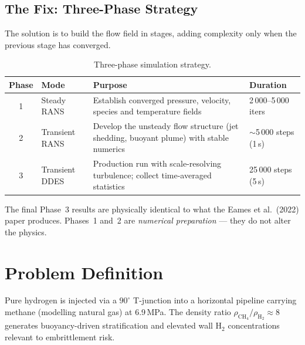 \documentclass[12pt,a4paper]{report}
\begin{document}
\subsection{The Fix: Three-Phase Strategy}

The solution is to build the flow field in stages, adding complexity
only when the previous stage has converged.

\begin{table}[H]
\centering
\caption{Three-phase simulation strategy.}
\label{tab:phases}
\begin{tabularx}{\textwidth}{@{}clXl@{}}
\toprule
\textbf{Phase} & \textbf{Mode} & \textbf{Purpose} & \textbf{Duration} \\
\midrule
1 & Steady RANS   & Establish converged pressure, velocity, species
                    and temperature fields & 2\,000--5\,000 iters \\
2 & Transient RANS & Develop the unsteady flow structure (jet
                     shedding, buoyant plume) with stable numerics
                   & $\sim$5\,000 steps (1\,s) \\
3 & Transient DDES & Production run with scale-resolving turbulence;
                     collect time-averaged statistics
                   & 25\,000 steps (5\,s) \\
\bottomrule
\end{tabularx}
\end{table}

\noindent The final Phase~3 results are physically identical to what
the Eames et al.\ (2022) paper produces.  Phases~1 and~2 are
\emph{numerical preparation} --- they do not alter the physics.


\section{Problem Definition}

Pure hydrogen is injected via a $90^{\circ}$ T-junction into a
horizontal pipeline carrying methane (modelling natural gas) at
6.9\,MPa.  The density ratio $\rho_{\mathrm{CH}_4}/\rho_{\mathrm{H}_2}
\approx 8$ generates buoyancy-driven stratification and elevated wall
H$_2$ concentrations relevant to embrittlement risk.
\end{document}
